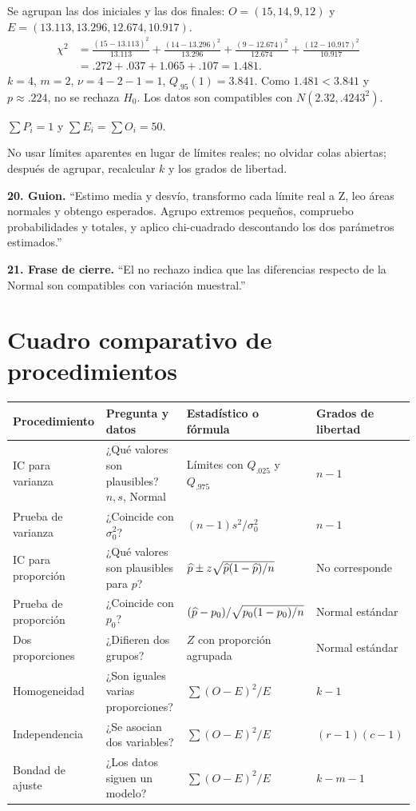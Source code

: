 \documentclass[11pt,a4paper]{article}
\newcommand{\cierre}[1]{\textbf{21. Frase de cierre.} ``#1''\par}
\begin{document}
Se agrupan las dos iniciales y las dos finales: $O=(15,14,9,12)$ y $E=(13.113,13.296,12.674,10.917)$.
\begin{align*}
\chi^2&=\frac{(15-13.113)^2}{13.113}+\frac{(14-13.296)^2}{13.296}
+\frac{(9-12.674)^2}{12.674}+\frac{(12-10.917)^2}{10.917}\\
&=.272+.037+1.065+.107=1.481.
\end{align*}
$k=4$, $m=2$, $\nu=4-2-1=1$, $Q_{.95}(1)=3.841$. Como $1.481<3.841$ y $p\approx.224$, no se rechaza $H_0$. Los datos son compatibles con $N(2.32,.4243^2)$.\par
\begin{comprobacion}$\sum P_i=1$ y $\sum E_i=\sum O_i=50$.\end{comprobacion}
\begin{errorbox}No usar límites aparentes en lugar de límites reales; no olvidar colas abiertas; después de agrupar, recalcular $k$ y los grados de libertad.\end{errorbox}
\begin{oral}\textbf{20. Guion.} ``Estimo media y desvío, transformo cada límite real a Z, leo áreas normales y obtengo esperados. Agrupo extremos pequeños, compruebo probabilidades y totales, y aplico chi-cuadrado descontando los dos parámetros estimados.''\end{oral}
\cierre{El no rechazo indica que las diferencias respecto de la Normal son compatibles con variación muestral.}

\section{Cuadro comparativo de procedimientos}
\small
\begin{table}[H]\centering
\begin{tabularx}{\textwidth}{L{3.1cm}Y L{3.2cm}L{2cm}}\toprule
\textbf{Procedimiento}&\textbf{Pregunta y datos}&\textbf{Estadístico o fórmula}&\textbf{Grados de libertad}\\\midrule
IC para varianza&¿Qué valores son plausibles? $n,s$, Normal&Límites con $Q_{.025}$ y $Q_{.975}$&$n-1$\\
Prueba de varianza&¿Coincide con $\sigma_0^2$?&$(n-1)s^2/\sigma_0^2$&$n-1$\\
IC para proporción&¿Qué valores son plausibles para $p$?&$\widehat p\pm z\sqrt{\widehat p(1-\widehat p)/n}$&No corresponde\\
Prueba de proporción&¿Coincide con $p_0$?&$(\widehat p-p_0)/\sqrt{p_0(1-p_0)/n}$&Normal estándar\\
Dos proporciones&¿Difieren dos grupos?&$Z$ con proporción agrupada&Normal estándar\\
Homogeneidad&¿Son iguales varias proporciones?&$\sum(O-E)^2/E$&$k-1$\\
Independencia&¿Se asocian dos variables?&$\sum(O-E)^2/E$&$(r-1)(c-1)$\\
Bondad de ajuste&¿Los datos siguen un modelo?&$\sum(O-E)^2/E$&$k-m-1$\\\bottomrule
\end{tabularx}\end{table}\normalsize
\end{document}
